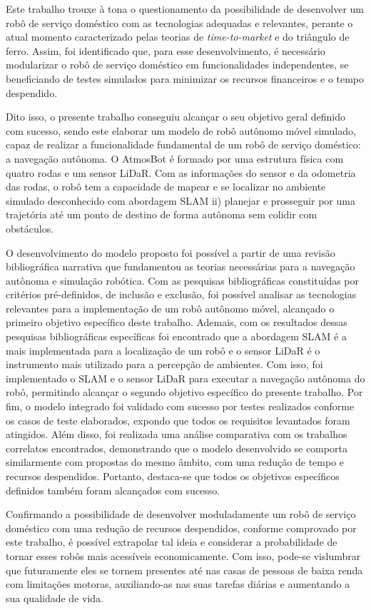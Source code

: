 
Este trabalho trouxe à tona o questionamento da possibilidade de desenvolver um robô de serviço doméstico com as tecnologias adequadas e relevantes, perante o atual momento caracterizado pelas teorias de  \textit{time-to-market} e do triângulo de ferro. Assim, foi identificado que, para esse desenvolvimento, é necessário modularizar o robô de serviço doméstico em funcionalidades independentes, se beneficiando de testes simulados para minimizar os recursos financeiros e o tempo despendido.


Dito isso, o presente trabalho conseguiu alcançar o seu objetivo geral definido com sucesso, sendo este elaborar um modelo de robô autônomo móvel simulado, capaz de realizar a funcionalidade fundamental de um robô de serviço doméstico: a navegação autônoma. O AtmosBot é formado por uma estrutura física com quatro rodas e um sensor LiDaR. Com as informações do sensor e da odometria das rodas, o robô tem a capacidade de mapear e se localizar no ambiente simulado desconhecido com abordagem SLAM ii) planejar e prosseguir por uma trajetória até um ponto de destino de forma autônoma sem colidir com obstáculos.

O desenvolvimento do modelo proposto foi possível a partir de uma revisão bibliográfica narrativa que fundamentou as teorias necessárias para a navegação autônoma e simulação robótica. Com as pesquisas bibliográficas constituídas por critérios pré-definidos, de inclusão e exclusão, foi possível analisar as tecnologias relevantes para a implementação de um robô autônomo móvel, alcançado o primeiro objetivo específico deste trabalho. Ademais, com os resultados dessas pesquisas bibliográficas específicas
foi encontrado que a abordagem SLAM é a mais implementada para a localização de um robô e o sensor LiDaR é o instrumento mais utilizado para a percepção de ambientes. Com isso,  foi implementado o SLAM e o sensor LiDaR para executar a navegação autônoma do robô, permitindo alcançar o segundo objetivo específico do presente trabalho. Por fim, o modelo integrado foi validado com sucesso por testes realizados conforme os casos de teste elaborados, expondo que todos os requisitos levantados foram atingidos. Além disso, foi realizada uma análise comparativa com os trabalhos correlatos encontrados, demonstrando que o modelo desenvolvido se comporta similarmente com propostas do mesmo âmbito, com uma redução de tempo e recursos despendidos. Portanto, destaca-se que todos os objetivos específicos definidos também foram alcançados com sucesso.

Confirmando a possibilidade de desenvolver moduladamente um robô de serviço doméstico com uma redução de recursos despendidos, conforme comprovado por este trabalho, é possível extrapolar tal ideia e considerar a probabilidade de tornar esses robôs mais acessíveis economicamente. Com isso, pode-se vislumbrar  que futuramente eles se tornem presentes até nas casas de pessoas de baixa renda com limitações motoras, auxiliando-as nas suas tarefas diárias e aumentando a sua qualidade de vida. 

